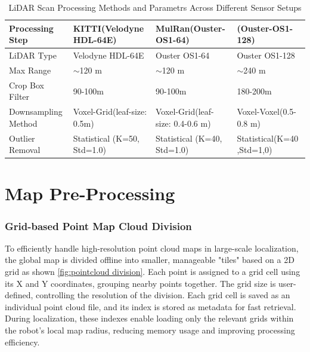 \begin{table}[htbp]
\centering
\caption{LiDAR Scan Processing Methods and Parametrs  Across Different Sensor Setups}
\label{tab:lidar_preprocessing}
\begin{tabular}{|p{3.5cm}|p{3.5cm}|p{3.5cm}|p{3.5cm}|}
\hline
\textbf{Processing Step} & \textbf{KITTI(Velodyne HDL-64E)} & \textbf{MulRan(Ouster-OS1-64)} & \textbf{(Ouster-OS1-128)} \\
\hline
LiDAR Type & Velodyne HDL-64E & Ouster OS1-64 & Ouster OS1-128 \\
\hline
Max Range & $\sim$120 m & $\sim$120 m & $\sim$240 m \\
\hline
Crop Box Filter & 90-100m & 90-100m & 180-200m\\
\hline
Downsampling Method & Voxel-Grid(leaf-size: 0.5m) & Voxel-Grid(leaf-size: 0.4-0.6 m) & Voxel-Voxel(0.5-0.8 m) \\
\hline
Outlier Removal & Statistical (K=50, Std=1.0) & Statistical (K=40, Std=1.0) & Statistical(K=40 ,Std=1,0) \\
\hline
\end{tabular}
\end{table}

\section{Map Pre-Processing}

\subsubsection{Grid-based Point Map Cloud Division }

To efficiently handle high-resolution point cloud maps in large-scale localization, the global map is divided offline into smaller, manageable "tiles" based on a 2D grid as shown \ref{fig:pointcloud division}. Each point is assigned to a grid cell using its X and Y coordinates, grouping nearby points together. The grid size is user-defined, controlling the resolution of the division. Each grid cell is saved as an individual point cloud file, and its index is stored as metadata for fast retrieval. During localization, these indexes enable loading only the relevant grids within the robot's local map radius, reducing memory usage and improving processing efficiency.



